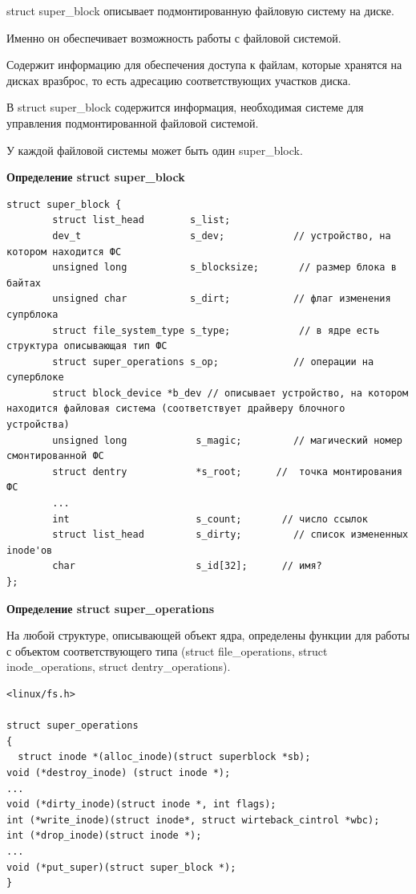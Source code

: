 struct super\_block описывает подмонтированную файловую систему на диске.

Именно он обеспечивает возможность работы с файловой системой.

Содержит информацию для обеспечения доступа к файлам, которые хранятся на дисках вразброс, то есть адресацию соответствующих участков диска.

В struct super\_block содержится информация, необходимая системе для управления подмонтированной файловой системой.

У каждой файловой системы может быть один super\_block.

\textbf{Определение struct super\_block}

\begin{lstlisting}
struct super_block {
        struct list_head        s_list;            
        dev_t                   s_dev;            // устройство, на котором находится ФС
        unsigned long           s_blocksize;       // размер блока в байтах
        unsigned char           s_dirt;           // флаг изменения супрблока
        struct file_system_type s_type;            // в ядре есть структура описывающая тип ФС
        struct super_operations s_op;             // операции на суперблоке
        struct block_device *b_dev // описывает устройство, на котором находится файловая система (соответствует драйверу блочного устройства)
        unsigned long            s_magic;         // магический номер смонтированной ФС
        struct dentry            *s_root;      //  точка монтирования ФС
        ...
        int                      s_count;       // число ссылок
        struct list_head         s_dirty;         // список измененных inode'ов
        char                     s_id[32];      // имя?
};
\end{lstlisting}

\textbf{Определение struct super\_operations}

На любой структуре, описывающей объект ядра, определены функции для работы с объектом соответствующего типа (struct file\_operations, struct inode\_operations, struct dentry\_operations).

\begin{lstlisting}
<linux/fs.h>

struct super_operations
{
  struct inode *(alloc_inode)(struct superblock *sb);
void (*destroy_inode) (struct inode *);
...
void (*dirty_inode)(struct inode *, int flags);
int (*write_inode)(struct inode*, struct wirteback_cintrol *wbc);
int (*drop_inode)(struct inode *);
...
void (*put_super)(struct super_block *);
}

\end{lstlisting}


